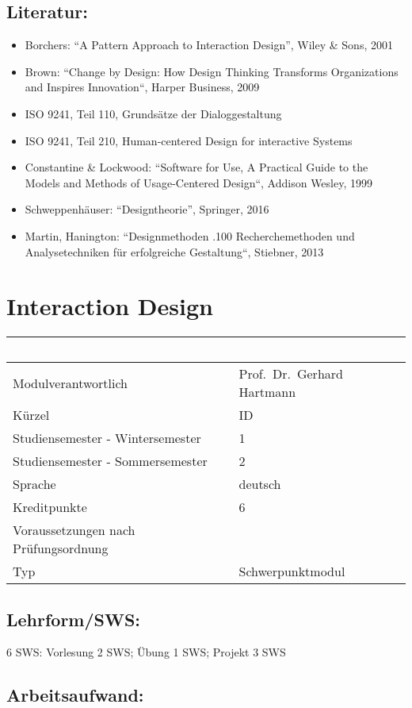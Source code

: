 \section*{Literatur:}\label{literatur-4}

\begin{itemize}
\item
  Borchers: ``A Pattern Approach to Interaction Design'', Wiley \& Sons,
  2001
\item
  Brown: ``Change by Design: How Design Thinking Transforms
  Organizations and Inspires Innovation``, Harper Business, 2009
\item
  ISO 9241, Teil 110, Grundsätze der Dialoggestaltung
\item
  ISO 9241, Teil 210, Human-centered Design for interactive Systems
\item
  Constantine \& Lockwood: ``Software for Use, A Practical Guide to the
  Models and Methods of Usage-Centered Design``, Addison Wesley, 1999
\item
  Schweppenhäuser: ``Designtheorie'', Springer, 2016
\item
  Martin, Hanington: ``Designmethoden .100 Recherchemethoden und
  Analysetechniken für erfolgreiche Gestaltung``, Stiebner, 2013
\end{itemize}

\chapter{Interaction Design}\label{interaction-design}

\begin{longtable}[]{@{}ll@{}}
\toprule
~ & ~\tabularnewline
\midrule
\endhead
Modulverantwortlich & Prof.~Dr.~Gerhard Hartmann\tabularnewline
Kürzel & ID\tabularnewline
Studiensemester - Wintersemester & 1\tabularnewline
Studiensemester - Sommersemester & 2\tabularnewline
Sprache & deutsch\tabularnewline
Kreditpunkte & 6\tabularnewline
Voraussetzungen nach Prüfungsordnung &\tabularnewline
Typ & Schwerpunktmodul\tabularnewline
\bottomrule
\end{longtable}

\section*{Lehrform/SWS:}\label{lehrformsws-5}

6 SWS: Vorlesung 2 SWS; Übung 1 SWS; Projekt 3 SWS

\section*{Arbeitsaufwand:}\label{arbeitsaufwand-11}

